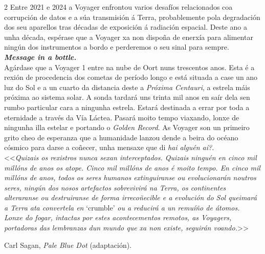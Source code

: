 \begin{refsection}
\begin{multicols}{2}
Entre 2021 e 2024 a Voyager enfrontou varios desafíos relacionados coa
corrupción de datos e a súa transmisión á Terra, probablemente pola degradación
dos seu aparellos tras décadas de exposición á radiación espacial. Deste ano a unha década, espérase que a Voyager xa non dispoña de enerxía para alimentar ningún dos
instrumentos a bordo e perderemos o seu sinal para sempre.\\

\textbf{\textit{Message in a bottle.}}\\
Agárdase que a Voyager 1 entre na nube de Oort nuns trescentos anos. Esta é a
rexión de procedencia dos cometas de período longo e está situada a case un ano
luz do Sol e a un cuarto da distancia deste a \textit{Próxima Centauri}, a
estrela máis próxima ao sistema solar. A sonda tardará uns trinta mil anos en
saír dela sen rumbo particular cara a ningunha estrela. Estará destinada a
errar por toda a eternidade a través da Vía Láctea. Pasará moito tempo
viaxando, lonxe de ningunha illa estelar e portando o \textit{Golden Record}.
As Voyager son un primeiro grito cheo de esperanza que a humanidade lanzou
dende a beira do océano cósmico para darse a coñecer, unha mensaxe que di
\textit{hai alguén aí?}. \\

<<\textit{Quizais os rexistros nunca sexan interceptados. Quizais ninguén en
cinco mil millóns de anos os atope. Cinco mil millóns de anos é moito tempo. En
cinco mil millóns de anos, todos os seres humanos extinguiranse ou
evolucionarán noutros seres, ningún dos nosos artefactos sobrevivirá na Terra,
os continentes alteraranse ou destruiranse de forma irrecoñecible e a evolución
do Sol queimará a Terra ata convertela en} `crumble' \textit{ou a reducirá a un
remuíño de átomos.\\ Lonxe do fogar, intactas por estes acontecementos remotos,
as Voyagers, portadoras das lembranzas dun mundo que xa non existe, seguirán
voando.}>>

\hfill Carl Sagan, \textit{Pale Blue Dot} (adaptación).

\nocite{oliver-berry.dmagmmvs_2019}
\nocite{sagan.c_2014}
\nocite{science_nasa_mission_voyager_timeline}
\nocite{photojournal_jpl_voyager_1}
\nocite{nasa_nssdc_gsfc}

\printbibliography

\end{multicols}
\end{refsection}
